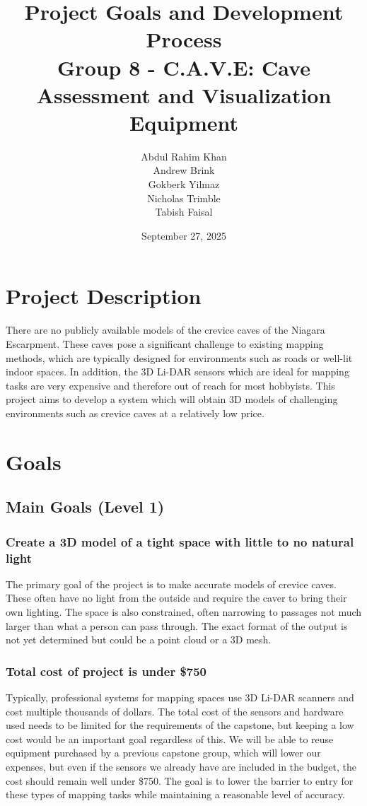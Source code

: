 \documentclass[11pt]{article}
\title{\bf{Project Goals and Development Process \\ \large Group 8 - C.A.V.E: Cave Assessment and Visualization Equipment}}
\author{Abdul Rahim Khan \\ Andrew Brink \\ Gokberk Yilmaz \\ Nicholas Trimble \\ Tabish Faisal}
\date{September 27, 2025}
\begin{document}
	\maketitle
	\newpage

	\section{Project Description} %
		There are no publicly available models of the crevice caves of the Niagara Escarpment. These caves pose a significant challenge to existing mapping methods, which are typically designed for environments such as roads or well-lit indoor spaces. In addition, the 3D Li-DAR sensors which are ideal for mapping tasks are very expensive and therefore out of reach for most hobbyists. This project aims to develop a system which will obtain 3D models of challenging environments such as crevice caves at a relatively low price.
	\section{Goals}
	\subsection{Main Goals (Level 1)} %
	\subsubsection{Create a 3D model of a tight space with little to no natural light}
		The primary goal of the project is to make accurate models of crevice caves. These often have no light from the outside and require the caver to bring their own lighting. The space is also constrained, often narrowing to passages not much larger than what a person can pass through. The exact format of the output is not yet determined but could be a point cloud or a 3D mesh.
	\subsubsection{Total cost of project is under \$750}
		Typically, professional systems for mapping spaces use 3D Li-DAR scanners and cost multiple thousands of dollars. The total cost of the sensors and hardware used needs to be limited for the requirements of the capstone, but keeping a low cost would be an important goal regardless of this. We will be able to reuse equipment purchased by a previous capstone group, which will lower our expenses, but even if the sensors we already have are included in the budget, the cost should remain well under \$750. The goal is to lower the barrier to entry for these types of mapping tasks while maintaining a reasonable level of accuracy.
\end{document}
